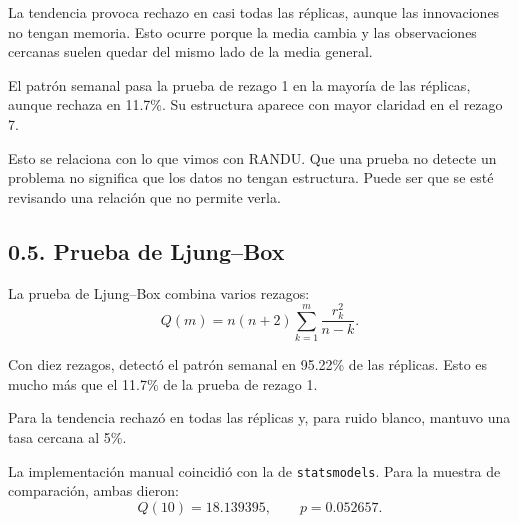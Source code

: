 \documentclass[11pt,letterpaper]{article}
\begin{document}
\begin{table}[H]
\centering
\small
\caption{Resultados de los procesos con innovaciones independientes. Los errores estándar aparecen entre paréntesis.}
\end{table}

La tendencia provoca rechazo en casi todas las réplicas, aunque las innovaciones no tengan memoria. Esto ocurre porque la media cambia y las observaciones cercanas suelen quedar del mismo lado de la media general.

El patrón semanal pasa la prueba de rezago 1 en la mayoría de las réplicas, aunque rechaza en 11.7\%. Su estructura aparece con mayor claridad en el rezago 7.

Esto se relaciona con lo que vimos con RANDU. Que una prueba no detecte un problema no significa que los datos no tengan estructura. Puede ser que se esté revisando una relación que no permite verla.

\subsection*{0.5. Prueba de Ljung--Box}

La prueba de Ljung--Box combina varios rezagos:
\[
Q(m)
=
n(n+2)
\sum_{k=1}^{m}
\frac{r_k^2}{n-k}.
\]

Con diez rezagos, detectó el patrón semanal en 95.22\% de las réplicas. Esto es mucho más que el 11.7\% de la prueba de rezago 1.

Para la tendencia rechazó en todas las réplicas y, para ruido blanco, mantuvo una tasa cercana al 5\%.

La implementación manual coincidió con la de \texttt{statsmodels}. Para la muestra de comparación, ambas dieron:
\[
Q(10)=18.139395,
\qquad
p=0.052657.
\]
\end{document}
